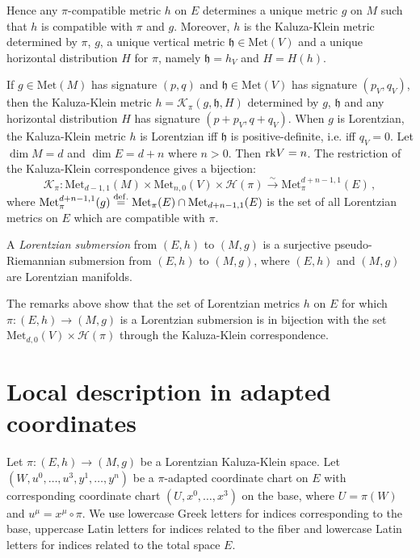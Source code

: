\documentclass[10pt, cmp, numbook, final, a4paper]{svjour}
\newcommand{\eqdef}{\stackrel{{\rm def.}}{=}}
\def\rk{{\rm rk}}
\newcommand{\be}{\begin{equation*}}
\newcommand{\ee}{\end{equation*}}
\def\cH{\mathcal{H}}
\def\Met{\mathrm{Met}}
\def\fh{\mathfrak{h}}
\begin{document}
\noindent Hence any $\pi$-compatible metric $h$ on $E$ determines a
unique metric $g$ on $M$ such that $h$ is compatible with $\pi$ and
$g$. Moreover, $h$ is the Kaluza-Klein metric determined
by $\pi$, $g$, a unique vertical metric $\fh\in \Met(V)$ and a unique
horizontal distribution $H$ for $\pi$, namely $\fh=h_V$ and $H=H(h)$.

If $g\in \Met(M)$ has signature $(p,q)$ and $\fh\in \Met(V)$ has
signature $(p_V,q_V)$, then the Kaluza-Klein metric
$h=\mathcal{K}_\pi(g,\fh,H)$ determined by $g$, $\fh$ and any
horizontal distribution $H$ has signature $(p+p_V,q+q_V)$. When $g$ is
Lorentzian, the Kaluza-Klein metric $h$ is Lorentzian iff $\fh$ is
positive-definite, i.e. iff $q_V=0$. Let $\dim M=d$ and $\dim E=d+n$
where $n>0$. Then $\rk V = n$. The restriction of the Kaluza-Klein
correspondence gives a bijection:
\be
\mathcal{K}_\pi:\Met_{d-1,1}(M)\times \Met_{n,0}(V)\times \cH(\pi)\stackrel{\sim}{\rightarrow} \Met^{d+n-1,1}_\pi(E)\, ,
\ee
where $\Met^{d+n-1,1}_\pi(g)\eqdef \Met_\pi(E)\cap \Met_{d+n-1,1}(E)$
is the set of all Lorentzian metrics on $E$ which are compatible with
$\pi$.

\begin{definition}
A {\em Lorentzian submersion} from $(E,h)$ to $(M,g)$ is a surjective
pseudo-Riemannian submersion from $(E,h)$ to $(M,g)$, where $(E,h)$
and $(M,g)$ are Lorentzian manifolds.
\end{definition}

\noindent 
The remarks above show that the set of Lorentzian metrics $h$ on $E$
for which $\pi:(E,h)\rightarrow (M,g)$ is a Lorentzian submersion is
in bijection with the set $\Met_{d,0}(V)\times \cH(\pi)$ through the
Kaluza-Klein correspondence.

\section{Local description in adapted coordinates}
\label{app:localadapted}

Let $\pi:(E,h)\rightarrow (M,g)$ be a Lorentzian Kaluza-Klein space. 
Let $(W,u^0,\ldots, u^3, y^1, \ldots, y^n)$ be a $\pi$-adapted
coordinate chart on $E$ with corresponding coordinate chart
$(U,x^0,\ldots, x^3)$ on the base, where $U=\pi(W)$ and
$u^\mu=x^\mu\circ \pi$. We use lowercase Greek letters for indices
corresponding to the base, uppercase Latin letters for indices related
to the fiber and lowercase Latin letters for indices related to the
total space $E$.
\end{document}
